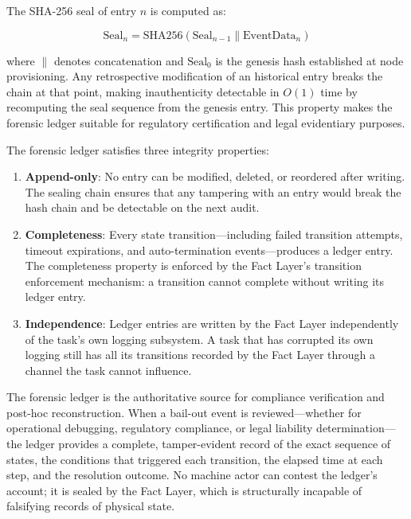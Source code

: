 The SHA-256 seal of entry $n$ is computed as:

\begin{equation}
\text{Seal}_n = \text{SHA256}(\text{Seal}_{n-1} \parallel \text{EventData}_n)
\tag{L-seal}
\end{equation}

where $\parallel$ denotes concatenation and $\text{Seal}_0$ is the genesis hash established at node provisioning. Any retrospective modification of an historical entry breaks the chain at that point, making inauthenticity detectable in $O(1)$ time by recomputing the seal sequence from the genesis entry. This property makes the forensic ledger suitable for regulatory certification and legal evidentiary purposes.

The forensic ledger satisfies three integrity properties:

\begin{enumerate}
\item \textbf{Append-only}: No entry can be modified, deleted, or reordered after writing. The sealing chain ensures that any tampering with an entry would break the hash chain and be detectable on the next audit.

\item \textbf{Completeness}: Every state transition---including failed transition attempts, timeout expirations, and auto-termination events---produces a ledger entry. The completeness property is enforced by the Fact Layer's transition enforcement mechanism: a transition cannot complete without writing its ledger entry.

\item \textbf{Independence}: Ledger entries are written by the Fact Layer independently of the task's own logging subsystem. A task that has corrupted its own logging still has all its transitions recorded by the Fact Layer through a channel the task cannot influence.
\end{enumerate}

The forensic ledger is the authoritative source for compliance verification and post-hoc reconstruction. When a bail-out event is reviewed---whether for operational debugging, regulatory compliance, or legal liability determination---the ledger provides a complete, tamper-evident record of the exact sequence of states, the conditions that triggered each transition, the elapsed time at each step, and the resolution outcome. No machine actor can contest the ledger's account; it is sealed by the Fact Layer, which is structurally incapable of falsifying records of physical state.

